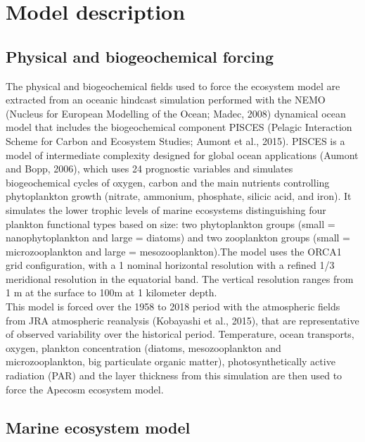 \section{Model description}

\subsection{Physical and biogeochemical forcing}

The physical and biogeochemical fields used to force the ecosystem model are extracted from an oceanic hindcast  simulation performed with the NEMO (Nucleus for European Modelling of the Ocean; Madec, 2008) dynamical ocean model that includes the biogeochemical component PISCES (Pelagic Interaction Scheme for Carbon and Ecosystem Studies; Aumont et al., 2015). PISCES is a model of intermediate complexity designed for global ocean applications (Aumont and Bopp, 2006), which uses 24 prognostic variables and simulates biogeochemical cycles of oxygen, carbon and the main nutrients controlling phytoplankton growth (nitrate, ammonium, phosphate, silicic acid, and iron). It simulates the lower trophic levels of marine ecosystems distinguishing four plankton functional types based on size: two phytoplankton groups (small = nanophytoplankton and large = diatoms) and two zooplankton groups (small = microzooplankton and
large = mesozooplankton).The model uses the ORCA1 grid configuration, with a 1\degree{} nominal horizontal resolution with a refined 1/3\degree{} meridional resolution in the equatorial band. The vertical resolution ranges from 1 m at the surface to 100m at 1 kilometer depth. \\ 


This model is forced over the 1958 to 2018 period with the atmospheric fields from JRA atmospheric reanalysis (Kobayashi et al., 2015), that are representative of observed variability  over the historical period. Temperature, ocean transports, oxygen, plankton concentration (diatoms, mesozooplankton and microzooplankton, big particulate organic matter), photosynthetically active radiation (PAR) and the layer thickness from this simulation are then used to force the Apecosm ecosystem model.\\


\subsection{Marine ecosystem model}

